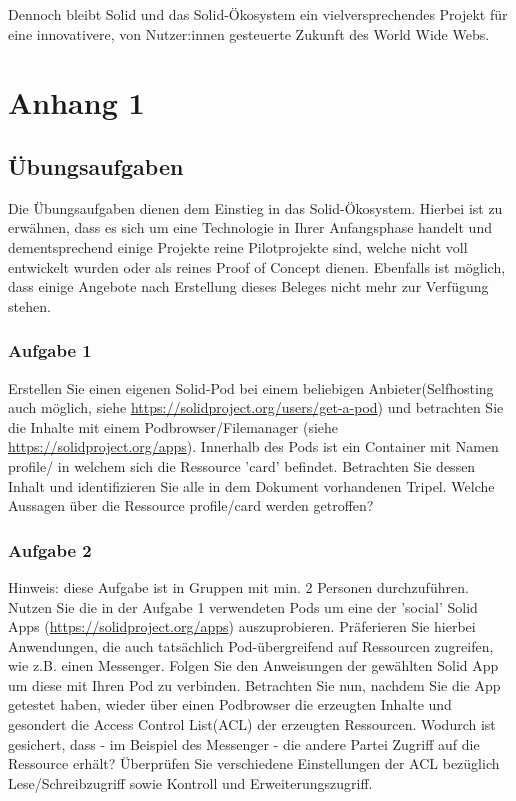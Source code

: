 \documentclass[acmtog]{acmart}
\begin{document}
Dennoch bleibt Solid und das Solid-Ökosystem ein vielversprechendes Projekt für eine innovativere, von Nutzer:innen gesteuerte Zukunft des World Wide Webs.




\appendix

\section{Anhang 1}

\subsection{Übungsaufgaben}
Die Übungsaufgaben dienen dem Einstieg in das Solid-Ökosystem. Hierbei ist zu erwähnen, dass es sich um eine Technologie in Ihrer Anfangsphase handelt und dementsprechend einige Projekte reine Pilotprojekte sind, welche nicht voll entwickelt wurden oder als reines Proof of Concept dienen. Ebenfalls ist möglich, dass einige Angebote nach Erstellung dieses Beleges nicht mehr zur Verfügung stehen.
\subsubsection{Aufgabe 1}
Erstellen Sie einen eigenen Solid-Pod bei einem beliebigen Anbieter(Selfhosting auch möglich, siehe \url{https://solidproject.org/users/get-a-pod}) und betrachten Sie die Inhalte mit einem Podbrowser/Filemanager (siehe \url{https://solidproject.org/apps}). Innerhalb des Pods ist ein Container mit Namen profile/ in welchem sich die Ressource 'card' befindet. Betrachten Sie dessen Inhalt und identifizieren Sie alle in dem Dokument vorhandenen Tripel. Welche Aussagen über die Ressource profile/card werden getroffen?
\subsubsection{Aufgabe 2}
Hinweis: diese Aufgabe ist in Gruppen mit min. 2 Personen durchzuführen.
Nutzen Sie die in der Aufgabe 1 verwendeten Pods um eine der 'social' Solid Apps (\url{https://solidproject.org/apps}) auszuprobieren. Präferieren Sie hierbei Anwendungen, die auch tatsächlich Pod-übergreifend auf Ressourcen zugreifen, wie z.B. einen Messenger. Folgen Sie den Anweisungen der gewählten Solid App um diese mit Ihren Pod zu verbinden. Betrachten Sie nun, nachdem Sie die App getestet haben, wieder über einen Podbrowser die erzeugten Inhalte und gesondert die Access Control List(ACL) der erzeugten Ressourcen.
Wodurch ist gesichert, dass - im Beispiel des Messenger - die andere Partei Zugriff auf die Ressource erhält? Überprüfen Sie verschiedene Einstellungen der ACL bezüglich Lese/Schreibzugriff sowie Kontroll und Erweiterungszugriff. 
\end{document}
